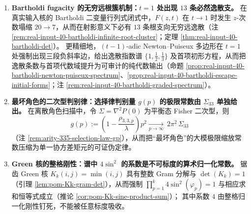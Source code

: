 \begin{enumerate}
  \item \textbf{Bartholdi fugacity 的无穷远根簇机制：\texorpdfstring{$t=1$}{t=1} 处出现 \texorpdfstring{$13$}{13} 条必然逸散支。}
  在真实输入核的 Bartholdi 二变量行列式闭式中，\(F(z,t)\) 在 \(t\to 1\) 时发生 \(z\)-次数塌缩 \(20\to 7\)，从而在射影意义下必有 \(13\) 条根支向无穷远逸散（注 \ref{rem:real-input-40-bartholdi-infinite-root-cluster}；定理 \ref{thm:real-input-40-bartholdi-det}）。
  更精细地，\((t-1)\)-adic Newton--Puiseux 多边形在 \(t=1\) 处强制出现三段负斜率边，给出逸散指数谱 \(\{1,\tfrac12,\tfrac13\}\) 及首项初形方程，从而把逸散条数与首项代数域提升为可审计的纯代数输出（命题 \ref{prop:real-input-40-bartholdi-newton-puiseux-spectrum}、\ref{prop:real-input-40-bartholdi-escape-initial-forms}；注 \ref{rem:real-input-40-bartholdi-graded-spectrum}）。

  \item \textbf{最坏角色的二次型判别律：选择律判别量 \texorpdfstring{$g(p)$}{g(p)} 的极限常数由 \texorpdfstring{$\Sigma_{33}$}{Sigma33} 单独给出。}
  在离散角色扫描中，令 \(\Sigma=\nabla^2P(0)\) 为平衡态 Fisher 二次型，则
  \[
  g(p):=\left(1-\frac{\rho_{3,3,p}}{\lambda}\right)p^2
  \xrightarrow[p\to\infty]{}\ 2\pi^2\,\Sigma_{33}
  \]
  （注 \ref{rem:arity-335-selection-law-gp}），从而把“最坏角色”的大模极限缩放常数压缩为单一协方差矩元的可证伪定律。

  \item \textbf{Green 核的整格刚性：谱中 \texorpdfstring{$4\sin^2$}{4 sin^2} 的系数是不可标度的算术归一化常数。}
  锯齿 Green 核 \(K_k(i,j)=\min(i,j)\) 具有整数 Gram 分解与 \(\det(K_k)=1\)（引理 \ref{lem:pom-Kk-gram-det}），从而强制
  \(\prod_{p=1}^k 4\sin^2(\varphi_p)=1\)
  与相应求和恒等式成立（推论 \ref{cor:pom-Kk-sine-product-sum}）；
  其中系数 \(4\) 由整格归一化刚性钉死，不能被任意标度吸收。
\end{enumerate}

